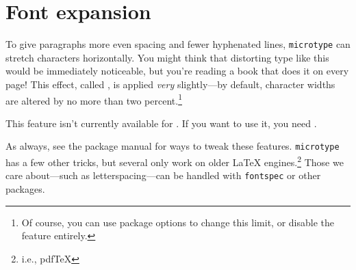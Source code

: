 \section{Font expansion}

To give paragraphs more even spacing and fewer hyphenated lines,
\texttt{microtype} can stretch characters horizontally.
You might think that distorting type like this would be immediately
noticeable,
but you're reading a book that does it on every page!
This effect, called ,
is applied \emph{very} slightly---by default,
character widths are altered by no more than two percent.\punckern\footnote{%
Of course, you can use package options to change this limit,
or disable the feature entirely.}

This feature isn't currently available for \XeLaTeX{}.
If you want to use it, you need \LuaLaTeX{}.

\exercises{}

As always, see the package manual for ways to tweak these features.
\texttt{microtype} has a few other tricks,
but several only work on older \LaTeX{} engines.\punckern\footnote{i.e., pdf\TeX}
Those we care about---such as letterspacing---can be handled with
\texttt{fontspec} or other packages.
